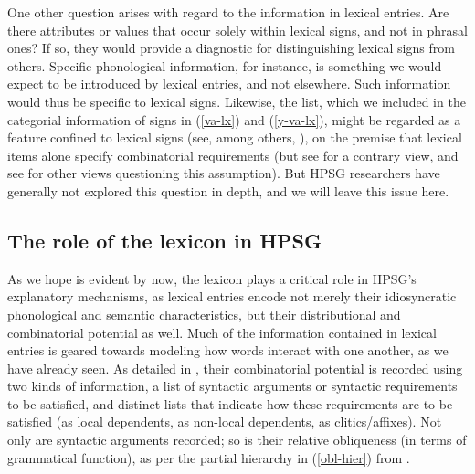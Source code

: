 \documentclass[output=paper]{langsci/langscibook}
\begin{document}
One other question arises with regard to the information in lexical entries.
Are there attributes or values that occur solely within lexical signs, and not in phrasal ones? 
If so, they would provide a diagnostic for distinguishing lexical signs from others.
Specific phonological information, for instance, is something we would expect to be introduced by lexical entries, and not elsewhere.
Such information would thus be specific to lexical signs. 
Likewise, the    list, which we included in the categorial information of signs in (\ref{va-lx}) and (\ref{y-va-lx}), might be regarded as a feature confined to lexical signs (see, among others, \citealt{GSag2000a-u}), on the premise that lexical items alone specify combinatorial requirements (but see \citet{Przepiorkowski2001} for a contrary view, and see  for other views questioning this assumption).
But HPSG researchers have generally not explored this question in depth, and we will leave this issue here.


\subsection{The role of the lexicon in HPSG}

As we hope is evident by now, the lexicon plays a critical role in HPSG's explanatory mechanisms, as lexical entries encode not merely their idiosyncratic phonological and semantic characteristics, but their distributional and combinatorial potential as well.
Much of the information contained in lexical entries is geared towards modeling how words interact with one another, as we have already seen. 
As detailed in , their combinatorial potential is recorded using two kinds of information, 
a list of syntactic arguments or syntactic requirements to be satisfied, and distinct lists that indicate how these requirements are to be satisfied (as local dependents, as non-local dependents, as clitics/affixes).
Not only are syntactic arguments recorded; so is their relative obliqueness (in terms of grammatical function), as per the partial hierarchy in (\ref{obl-hier}) from \citet{PollardandSag1992}. 
\end{document}
